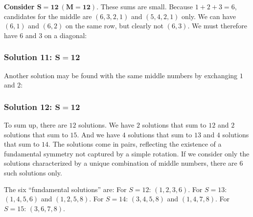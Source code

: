 \documentclass[12pt]{article}
\begin{document}
\textbf{Consider $\mathbf{S=12~(M=12)}$}. These sums are small. Because $1+2+3=6$, candidates for the middle are $(6,3,2,1)$ and $(5,4,2,1)$ only. We can have $(6,1)$ and $(6,2)$ on the same row, but clearly not $(6,3)$. We must therefore have $6$ and $3$ on a diagonal: 
\begin{center}
\subsubsection*{Solution 11: $\mathbf{S=12}$}
\end{center}

Another solution may be found with the same middle numbers by exchanging $1$ and $2$:
\begin{center}
\subsubsection*{Solution 12: $\mathbf{S=12}$}
\end{center}

To sum up, there are $12$ solutions. We have $2$ solutions that sum to $12$ and $2$ solutions that sum to $15$. And we have $4$ solutions that sum to $13$ and $4$ solutions that sum to $14$. The solutions come in pairs, reflecting the existence of a fundamental symmetry not captured by a simple rotation. If we consider only the solutions characterized by a unique combination of middle numbers, there are $6$ such solutions only. 

The six ``fundamental solutions'' are: For $S=12$: $(1,2,3,6)$. For $S=13$: $(1,4,5,6)$ and $(1,2,5,8)$. For $S=14$: $(3,4,5,8)$ and $(1,4,7,8)$. For $S=15$: $(3,6,7,8)$. 
\end{document}
